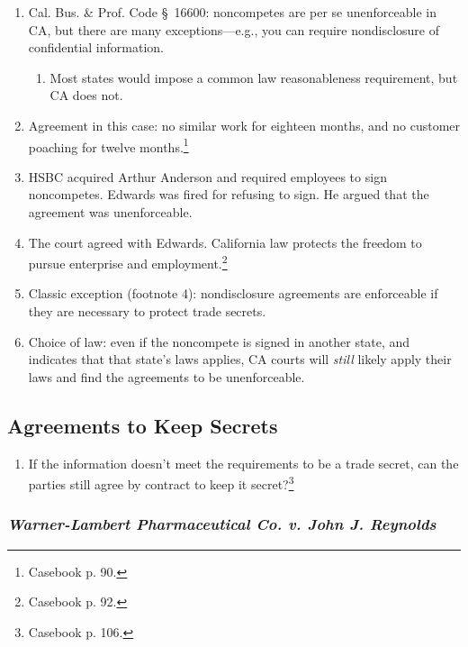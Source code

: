 
\begin{enumerate}
    \item Cal. Bus. \& Prof. Code \S\ 16600: noncompetes are per se 
    unenforceable in CA, but there are many exceptions---e.g., you can require 
    nondisclosure of confidential information.
    \begin{enumerate}
        \item Most states would impose a common law reasonableness 
        requirement, but CA does not.
    \end{enumerate}
    \item Agreement in this case: no similar work for eighteen months, and no 
    customer poaching for twelve months.\footnote{Casebook p. 90.}
    \item HSBC acquired Arthur Anderson and required employees to sign 
    noncompetes. Edwards was fired for refusing to sign. He argued that the 
    agreement was unenforceable.
    \item The court agreed with Edwards. California law protects the freedom 
    to pursue enterprise and employment.\footnote{Casebook p. 92.}
    \item Classic exception (footnote 4): nondisclosure agreements are 
    enforceable if they are necessary to protect trade secrets.
    \item Choice of law: even if the noncompete is signed in another state, 
    and indicates that that state's laws applies, CA courts will \emph{still} 
    likely apply their laws and find the agreements to be unenforceable.
\end{enumerate}

\subsection{Agreements to Keep Secrets}

\begin{enumerate}
    \item If the information doesn't meet the requirements to be a trade 
    secret, can the parties still agree by contract to keep it 
    secret?\footnote{Casebook p. 106.}
\end{enumerate}

\subsubsection{\emph{Warner-Lambert Pharmaceutical Co. v. John J. Reynolds}}

